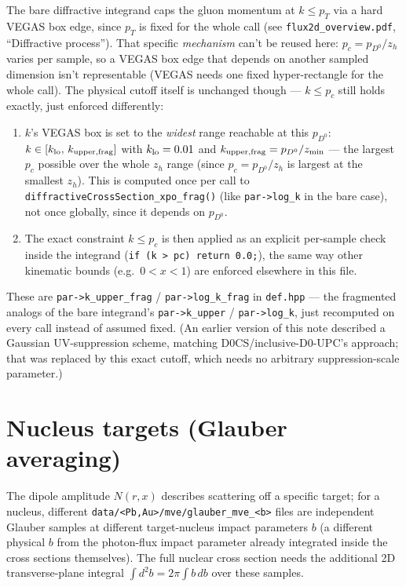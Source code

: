 \documentclass[11pt]{article}
\begin{document}
The bare diffractive integrand caps the gluon momentum at $k\le p_T$ via a
hard VEGAS box edge, since $p_T$ is fixed for the whole call (see
\texttt{flux2d\_overview.pdf}, ``Diffractive process''). That specific
\emph{mechanism} can't be reused here: $p_c=p_{D^0}/z_h$ varies per
sample, so a VEGAS box edge that depends on another sampled dimension
isn't representable (VEGAS needs one fixed hyper-rectangle for the whole
call). The physical cutoff itself is unchanged though — $k\le p_c$ still
holds exactly, just enforced differently:
\begin{enumerate}
\item $k$'s VEGAS box is set to the \emph{widest} range reachable at this
$p_{D^0}$: $k\in[k_{\rm lo},\,k_{\rm upper,frag}]$ with $k_{\rm lo}=0.01$
and $k_{\rm upper,frag}=p_{D^0}/z_{\min}$ — the largest $p_c$ possible
over the whole $z_h$ range (since $p_c=p_{D^0}/z_h$ is largest at the
smallest $z_h$). This is computed once per call to
\texttt{diffractiveCrossSection\_xpo\_frag()} (like \texttt{par->log\_k}
in the bare case), not once globally, since it depends on $p_{D^0}$.
\item The exact constraint $k\le p_c$ is then applied as an explicit
per-sample check inside the integrand (\texttt{if (k > pc) return 0.0;}),
the same way other kinematic bounds (e.g.\ $0<x<1$) are enforced elsewhere
in this file.
\end{enumerate}
These are \texttt{par->k\_upper\_frag} / \texttt{par->log\_k\_frag} in
\texttt{def.hpp} — the fragmented analogs of the bare integrand's
\texttt{par->k\_upper} / \texttt{par->log\_k}, just recomputed on every
call instead of assumed fixed. (An earlier version of this note described
a Gaussian UV-suppression scheme, matching D0CS/inclusive-D0-UPC's
approach; that was replaced by this exact cutoff, which needs no arbitrary
suppression-scale parameter.)

\section{Nucleus targets (Glauber averaging)}
\label{sec:target}

The dipole amplitude $N(r,x)$ describes scattering off a specific target;
for a nucleus, different \texttt{data/<Pb,Au>/mve/glauber\_mve\_<b>} files
are independent Glauber samples at different target-nucleus impact
parameters $b$ (a different physical $b$ from the photon-flux impact
parameter already integrated inside the cross sections themselves). The
full nuclear cross section needs the additional 2D transverse-plane
integral $\int d^2b = 2\pi\int b\,db$ over these samples.
\end{document}
